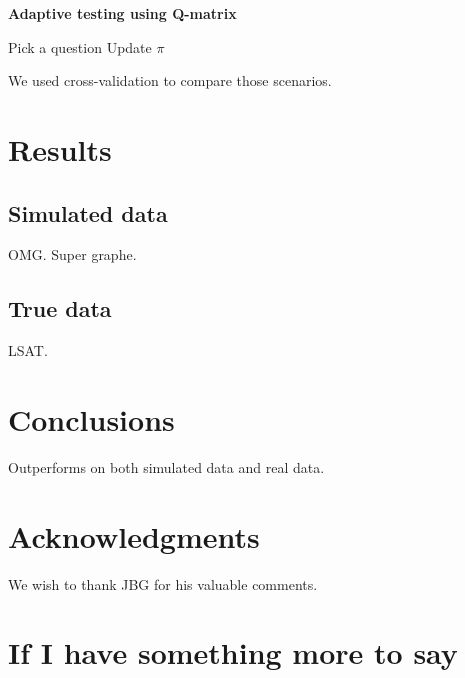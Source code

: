 \documentclass{sig-alternate}
\begin{document}
\begin{algorithm}
\caption*{\textbf{Adaptive testing using Q-matrix}}
\begin{algorithmic}
	\State Pick a question
	\State Update $\pi$
\EndWhile
\EndProcedure
\end{algorithmic}
\end{algorithm}

We used cross-validation to compare those scenarios.

\section{Results}

\subsection{Simulated data}

OMG. Super graphe.

\subsection{True data}

LSAT.

\section{Conclusions}

Outperforms on both simulated data and real data.

\section{Acknowledgments}

We wish to thank JBG for his valuable comments.


%
%
\appendix
\section{If I have something more to say}

\end{document}
